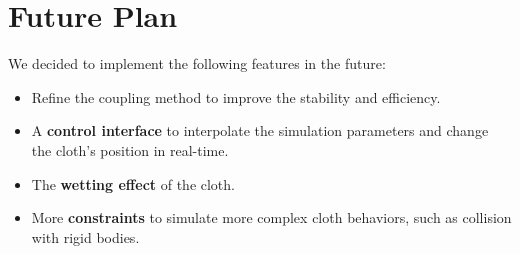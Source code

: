 \section{Future Plan}

We decided to implement the following features in the future:

\begin{itemize}
\item Refine the coupling method to improve the stability and efficiency.
\item A \textbf{control interface} to interpolate the simulation parameters and change the cloth's position in real-time.
\item The \textbf{wetting effect} of the cloth.
\item More \textbf{constraints} to simulate more complex cloth behaviors, such as collision with rigid bodies.
\end{itemize}


